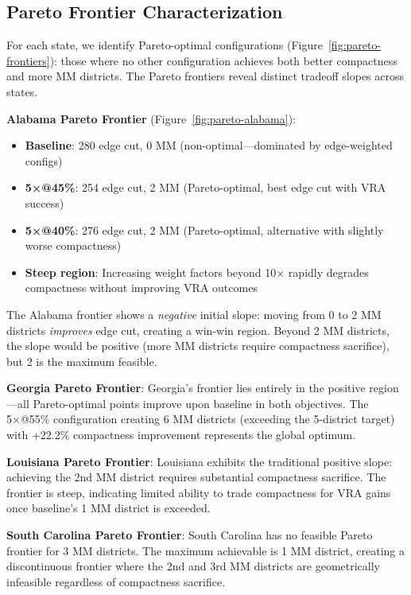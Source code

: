 \subsection{Pareto Frontier Characterization}

For each state, we identify Pareto-optimal configurations (Figure~\ref{fig:pareto-frontiers}): those where no other configuration achieves both better compactness and more MM districts. The Pareto frontiers reveal distinct tradeoff slopes across states.

\textbf{Alabama Pareto Frontier} (Figure~\ref{fig:pareto-alabama}):
\begin{itemize}
    \item \textbf{Baseline}: 280 edge cut, 0 MM (non-optimal---dominated by edge-weighted configs)
    \item \textbf{5×@45\%}: 254 edge cut, 2 MM (Pareto-optimal, best edge cut with VRA success)
    \item \textbf{5×@40\%}: 276 edge cut, 2 MM (Pareto-optimal, alternative with slightly worse compactness)
    \item \textbf{Steep region}: Increasing weight factors beyond 10× rapidly degrades compactness without improving VRA outcomes
\end{itemize}

The Alabama frontier shows a \emph{negative} initial slope: moving from 0 to 2 MM districts \emph{improves} edge cut, creating a win-win region. Beyond 2 MM districts, the slope would be positive (more MM districts require compactness sacrifice), but 2 is the maximum feasible.

\textbf{Georgia Pareto Frontier}: Georgia's frontier lies entirely in the positive region---all Pareto-optimal points improve upon baseline in both objectives. The 5×@55\% configuration creating 6 MM districts (exceeding the 5-district target) with +22.2\% compactness improvement represents the global optimum.

\textbf{Louisiana Pareto Frontier}: Louisiana exhibits the traditional positive slope: achieving the 2nd MM district requires substantial compactness sacrifice. The frontier is steep, indicating limited ability to trade compactness for VRA gains once baseline's 1 MM district is exceeded.

\textbf{South Carolina Pareto Frontier}: South Carolina has no feasible Pareto frontier for 3 MM districts. The maximum achievable is 1 MM district, creating a discontinuous frontier where the 2nd and 3rd MM districts are geometrically infeasible regardless of compactness sacrifice.

